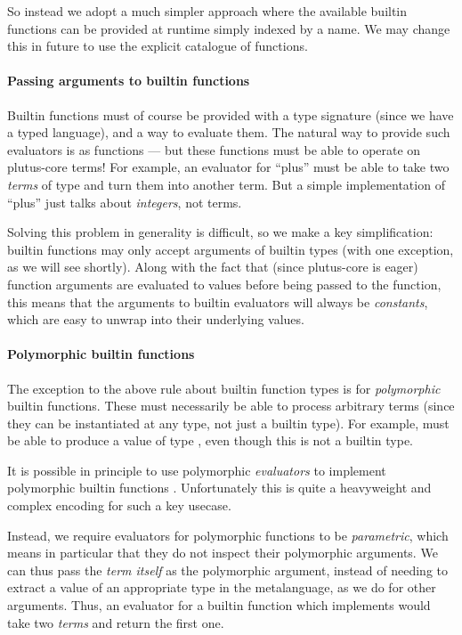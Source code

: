 So instead we adopt a much simpler approach where the available builtin functions can be provided at runtime simply indexed by a name.
We may change this in future to use the explicit catalogue of functions.

\paragraph{Passing arguments to builtin functions}

Builtin functions must of course be provided with a type signature (since we have a typed language), and a way to evaluate them.
The natural way to provide such evaluators is as functions --- but these functions must be able to operate on \gls{plutus-core} terms!
For example, an evaluator for ``plus'' must be able to take two \emph{terms} of type  and turn them into another term.
But a simple implementation of ``plus'' just talks about \emph{integers}, not terms.

Solving this problem in generality is difficult, so we make a key simplification: builtin functions may only accept arguments of builtin types (with one exception, as we will see shortly).
Along with the fact that (since \gls{plutus-core} is eager) function arguments are evaluated to values before being passed to the function, this means that the arguments to builtin evaluators will always be \emph{constants}, which are easy to unwrap into their underlying values.

\paragraph{Polymorphic builtin functions}
\label{sec:polymorphic-builtins}

The exception to the above rule about builtin function types is for \emph{polymorphic} builtin functions.
These must necessarily be able to process arbitrary terms (since they can be instantiated at any type, not just a builtin type).
For example,  must be able to produce a value of type , even though this is not a builtin type.

It is possible in principle to use polymorphic \emph{evaluators} to implement polymorphic builtin functions \autocite{lindley2012embedding}.
Unfortunately this is quite a heavyweight and complex encoding for such a key usecase.

Instead, we require evaluators for polymorphic functions to be \emph{parametric}, which means in particular that they do not inspect their polymorphic arguments.
We can thus pass the \emph{term itself} as the polymorphic argument, instead of needing to extract a value of an appropriate type in the metalanguage, as we do for other arguments.
Thus, an evaluator for a builtin function which implements  would take two \emph{terms} and return the first one.

